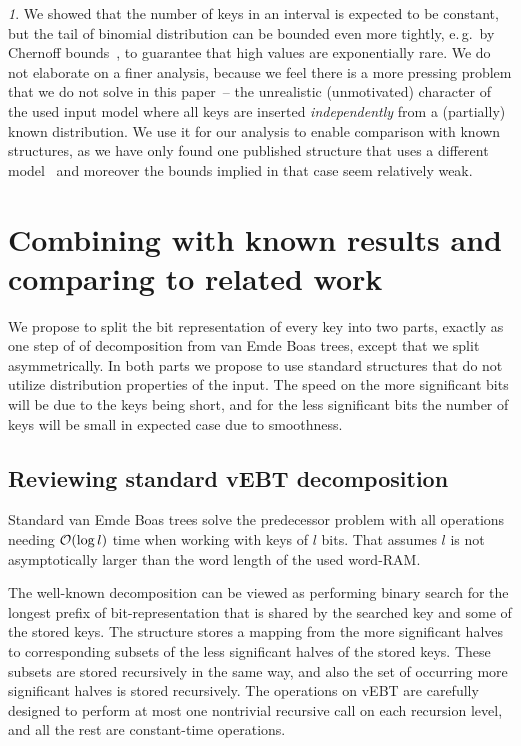 \documentclass[twoside,english,preprint]{elsarticle}
\theoremstyle{plain}
\theoremstyle{definition}
\theoremstyle{remark}
\newtheorem*{rem*}{\protect\remarkname}
\theoremstyle{plain}
\theoremstyle{plain}
\providecommand{\remarkname}{Remark}
\begin{document}
\begin{rem*}
We showed that the number of keys in an interval is expected to be constant, but the tail of binomial distribution can be bounded even more tightly, e.\,g.~by Chernoff bounds~\cite[chapter~4.1]{randomAlgs}, to guarantee that high values are exponentially rare.
We do not elaborate on a finer analysis, because we feel there is a more pressing problem that we do not solve in this paper~-- the unrealistic (unmotivated) character of the used input model where all keys are inserted \emph{independently} from a (partially) known distribution.
We use it for our analysis to enable comparison with known structures, as we have only found one published structure that uses a different model~\cite{DemaineJP04} and moreover the bounds implied in that case seem relatively weak.
\end{rem*}


\section{Combining with known results and comparing to related work \label{sec:main-results}}

We propose to split the bit representation of every key into two parts,
exactly as one step of of decomposition from van Emde Boas trees,
except that we split asymmetrically. In both parts we propose to use
standard structures that do not utilize distribution properties of
the input. The speed on the more significant bits will be due to the
keys being short, and for the less significant bits the number of
keys will be small in expected case due to smoothness.

\subsection{Reviewing standard vEBT decomposition}

Standard van Emde Boas trees solve the predecessor problem with all
operations needing $\mathcal O(\log l)$ time when working with keys of $l$
bits. That assumes $l$ is not asymptotically larger than the word
length of the used word-RAM.

The well-known decomposition can be viewed as performing binary search
for the longest prefix of bit-representation that is shared by the
searched key and some of the stored keys. The structure stores a mapping
from the more significant halves to corresponding subsets of the less
significant halves of the stored keys. These subsets are stored recursively
in the same way, and also the set of occurring more significant halves
is stored recursively. The operations on vEBT are carefully designed
to perform at most one nontrivial recursive call on each recursion
level, and all the rest are constant-time operations.
\end{document}
